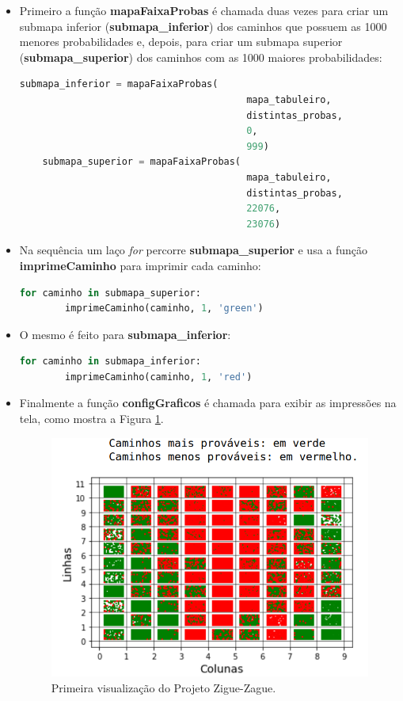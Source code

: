 \documentclass[12pt]{article}
\begin{document}
\begin{itemize}
	\item Primeiro a função \textbf{mapaFaixaProbas} é chamada duas vezes para criar um submapa inferior (\textbf{submapa\_inferior}) dos caminhos que possuem as 1000 menores probabilidades e, depois, para criar um submapa superior (\textbf{submapa\_superior}) dos caminhos com as 1000 maiores probabilidades:
	\begin{lstlisting}[language=Python]
	submapa_inferior = mapaFaixaProbas(
										mapa_tabuleiro, 
										distintas_probas, 
										0, 
										999)
	submapa_superior = mapaFaixaProbas(
										mapa_tabuleiro, 
										distintas_probas, 
										22076, 
										23076)
	\end{lstlisting}
	\item Na sequência um laço \textit{for} percorre \textbf{submapa\_superior} e usa a função \textbf{imprimeCaminho} para imprimir cada caminho:
	\begin{lstlisting}[language=Python]
	for caminho in submapa_superior:
		imprimeCaminho(caminho, 1, 'green')
	\end{lstlisting} 
	\item O mesmo é feito para \textbf{submapa\_inferior}:
	\begin{lstlisting}[language=Python]
	for caminho in submapa_inferior:
		imprimeCaminho(caminho, 1, 'red')
	\end{lstlisting}
	\item Finalmente a função \textbf{configGraficos} é chamada para exibir as impressões na tela, como mostra a Figura \ref{primeira_visualizacao}.
	\begin{figure}[ht]
		\centering
		\includegraphics[width=0.7\linewidth]{img/primeira_visualizacao.png}
		\caption{Primeira visualização do Projeto Zigue-Zague.}
		\label{primeira_visualizacao}
	\end{figure}
\end{itemize}
\end{document}
